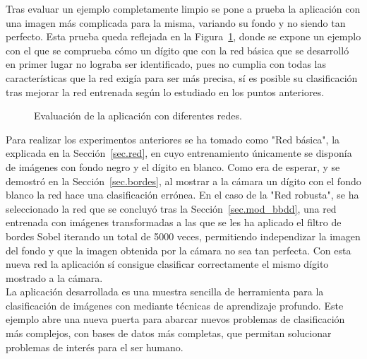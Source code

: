 Tras evaluar un ejemplo completamente limpio se pone a prueba la aplicación con una imagen más complicada para la misma, variando su fondo y no siendo tan perfecto. Esta prueba queda reflejada en la Figura~\ref{fig.experimento}, donde se expone un ejemplo con el que se comprueba cómo un dígito que con la red básica que se desarrolló en primer lugar no lograba ser identificado, pues no cumplia con todas las características que la red exigía para ser más precisa, sí es posible su clasificación tras mejorar la red entrenada según lo estudiado en los puntos anteriores. 

\begin{figure}[H]
	\centering
	 \hspace{5pt}
	\caption{Evaluación de la aplicación con diferentes redes.}
	\label{fig.experimento}
\end{figure}

Para realizar los experimentos anteriores se ha tomado como "Red básica", la explicada en la Sección~\ref{sec.red}, en cuyo entrenamiento únicamente se disponía de imágenes con fondo negro y el dígito en blanco. Como era de esperar, y se demostró en la Sección~\ref{sec.bordes}, al mostrar a la cámara un dígito con el fondo blanco la red hace una clasificación errónea. En el caso de la "Red robusta", se ha seleccionado la red que se concluyó tras la Sección~\ref{sec.mod_bbdd}, una red entrenada con imágenes transformadas a las que se les ha aplicado el filtro de bordes Sobel iterando un total de 5000 veces, permitiendo independizar la imagen del fondo y que la imagen obtenida por la cámara no sea tan perfecta. Con esta nueva red la aplicación sí consigue clasificar correctamente el mismo dígito mostrado a la cámara.\\

La aplicación desarrollada es una muestra sencilla de herramienta para la clasificación de imágenes con mediante técnicas de aprendizaje profundo. Este ejemplo abre una nueva puerta para abarcar nuevos problemas de clasificación más complejos, con bases de datos más completas, que permitan solucionar problemas de interés para el ser humano.
